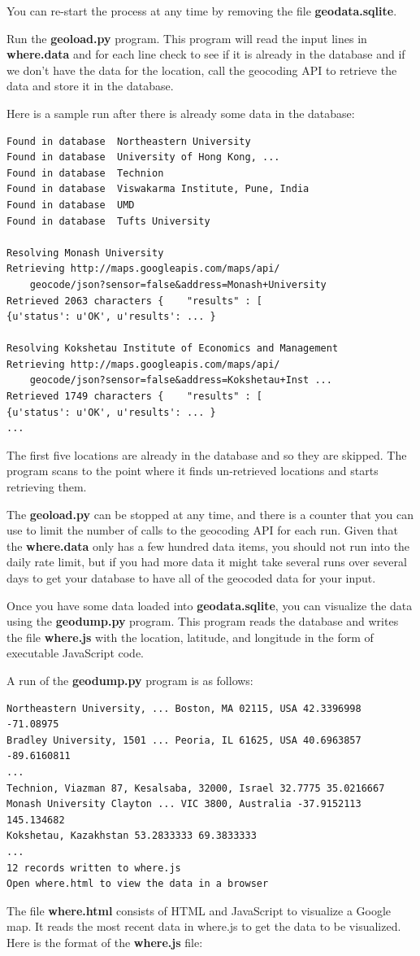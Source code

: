 \documentclass[11pt]{book}
\begin{document}
You can re-start the process at any time by removing the file
{\bf geodata.sqlite}.

Run the {\bf geoload.py} program.   This program will read the input
lines in {\bf where.data} and for each line check to see if it is already
in the database and if we don't have the data for the location,
call the geocoding API to retrieve the data and store it in 
the database.

Here is a sample run after there is already some data in the 
database:

\beforeverb
\begin{verbatim}
Found in database  Northeastern University
Found in database  University of Hong Kong, ...
Found in database  Technion
Found in database  Viswakarma Institute, Pune, India
Found in database  UMD
Found in database  Tufts University

Resolving Monash University
Retrieving http://maps.googleapis.com/maps/api/
    geocode/json?sensor=false&address=Monash+University
Retrieved 2063 characters {    "results" : [  
{u'status': u'OK', u'results': ... }

Resolving Kokshetau Institute of Economics and Management
Retrieving http://maps.googleapis.com/maps/api/
    geocode/json?sensor=false&address=Kokshetau+Inst ...
Retrieved 1749 characters {    "results" : [  
{u'status': u'OK', u'results': ... }
...
\end{verbatim}
\afterverb
%
The first five locations are already in the database and so they 
are skipped.  The program scans to the point where it finds un-retrieved
locations and starts retrieving them.

The {\bf geoload.py} can be stopped at any time, and there is a counter 
that you can use to limit the number of calls to the geocoding
API for each run.  Given that the {\bf where.data} only has a few hundred
data items, you should not run into the daily rate limit, but if you 
had more data it might take several runs over several days to 
get your database to have all of the geocoded data for your input.

Once you have some data loaded into {\bf geodata.sqlite}, you can 
visualize the data using the {\bf geodump.py} program.  This
program reads the database and writes the file {\bf where.js}
with the location, latitude, and longitude in the form of
executable JavaScript code.   

A run of the {\bf geodump.py} program is as follows:

\beforeverb
\begin{verbatim}
Northeastern University, ... Boston, MA 02115, USA 42.3396998 -71.08975
Bradley University, 1501 ... Peoria, IL 61625, USA 40.6963857 -89.6160811
...
Technion, Viazman 87, Kesalsaba, 32000, Israel 32.7775 35.0216667
Monash University Clayton ... VIC 3800, Australia -37.9152113 145.134682
Kokshetau, Kazakhstan 53.2833333 69.3833333
...
12 records written to where.js
Open where.html to view the data in a browser
\end{verbatim}
\afterverb
%
The file {\bf where.html} consists of HTML and JavaScript to visualize 
a Google map.  It reads the most recent data in where.js to get 
the data to be visualized.  Here is the format of the {\bf where.js} file:
\end{document}
